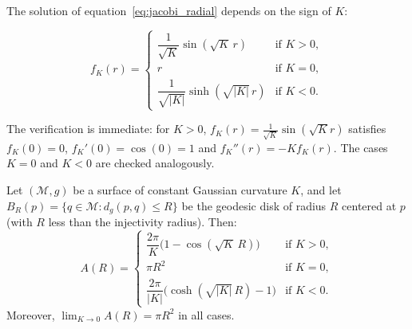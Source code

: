 The solution of equation~\eqref{eq:jacobi_radial} depends on the sign of $K$:

\begin{equation}\label{eq:soluciones_fK}
f_K(r) = \begin{cases}
\dfrac{1}{\sqrt{K}} \sin(\sqrt{K} \, r) & \text{if } K > 0, \\[8pt]
r & \text{if } K = 0, \\[8pt]
\dfrac{1}{\sqrt{|K|}} \sinh(\sqrt{|K|} \, r) & \text{if } K < 0.
\end{cases}
\end{equation}

The verification is immediate: for $K > 0$, $f_K(r) = \frac{1}{\sqrt{K}} \sin(\sqrt{K} r)$ satisfies $f_K(0) = 0$, $f_K'(0) = \cos(0) = 1$ and $f_K''(r) = -K f_K(r)$. The cases $K = 0$ and $K < 0$ are checked analogously.

\begin{theorem}\label{thm:area_disco_geodesico}
Let $(\mathcal{M}, g)$ be a surface of constant Gaussian curvature $K$, and let $B_R(p) = \{q \in \mathcal{M} : d_g(p,q) \leq R\}$ be the geodesic disk of radius $R$ centered at $p$ (with $R$ less than the injectivity radius). Then:
\begin{equation}\label{eq:area_disco_geodesico}
A(R) = \begin{cases}
\dfrac{2\pi}{K}\bigl(1 - \cos(\sqrt{K} \, R)\bigr) & \text{if } K > 0, \\[8pt]
\pi R^2 & \text{if } K = 0, \\[8pt]
\dfrac{2\pi}{|K|}\bigl(\cosh(\sqrt{|K|} \, R) - 1\bigr) & \text{if } K < 0.
\end{cases}
\end{equation}
Moreover, $\lim_{K \to 0} A(R) = \pi R^2$ in all cases.
\end{theorem}

